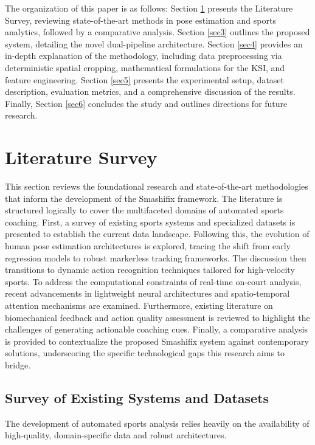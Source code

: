 \documentclass[pdflatex,sn-mathphys-num]{sn-jnl}%
\theoremstyle{thmstyleone}%
\theoremstyle{thmstyletwo}%
\theoremstyle{thmstylethree}%
\begin{document}
The organization of this paper is as follows: Section \ref{sec2} presents the Literature Survey, reviewing state-of-the-art methods in pose estimation and sports analytics, followed by a comparative analysis. Section \ref{sec3} outlines the proposed system, detailing the novel dual-pipeline architecture. Section \ref{sec4} provides an in-depth explanation of the methodology, including data preprocessing via deterministic spatial cropping, mathematical formulations for the KSI, and feature engineering. Section \ref{sec5} presents the experimental setup, dataset description, evaluation metrics, and a comprehensive discussion of the results. Finally, Section \ref{sec6} concludes the study and outlines directions for future research.


\section{Literature Survey}\label{sec2}

This section reviews the foundational research and state-of-the-art methodologies that inform the development of the Smashifix framework. The literature is structured logically to cover the multifaceted domains of automated sports coaching. First, a survey of existing sports systems and specialized datasets is presented to establish the current data landscape. Following this, the evolution of human pose estimation architectures is explored, tracing the shift from early regression models to robust markerless tracking frameworks. The discussion then transitions to dynamic action recognition techniques tailored for high-velocity sports. To address the computational constraints of real-time on-court analysis, recent advancements in lightweight neural architectures and spatio-temporal attention mechanisms are examined. Furthermore, existing literature on biomechanical feedback and action quality assessment is reviewed to highlight the challenges of generating actionable coaching cues. Finally, a comparative analysis is provided to contextualize the proposed Smashifix system against contemporary solutions, underscoring the specific technological gaps this research aims to bridge.

\subsection{Survey of Existing Systems and Datasets}
The development of automated sports analysis relies heavily on the availability of high-quality, domain-specific data and robust architectures. 
\end{document}
